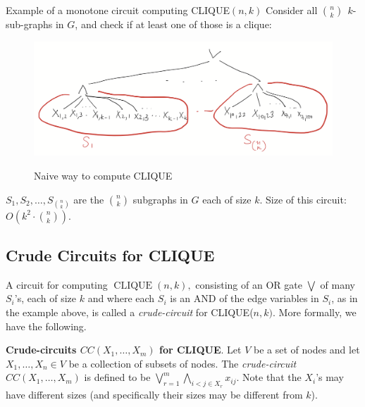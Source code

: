 \begin{trailer}{Example of a monotone circuit computing CLIQUE$(n, k)$}
Consider  all $\binom{n}{k} ~~ k$-sub-graphs in $G$, and check if at least one of those is a clique:

\begin{figure}
    \centering
    \includegraphics[width=0.75\linewidth]{images/k-clique-simple-circuit.png}
    \label{fig:clique-naive}
    \caption{Naive way to compute CLIQUE}
\end{figure}

$S_1, S_2, \ldots, S_{\binom{n}{k}}$ are the $\binom{n}{k}$ subgraphs in $G$ each of size $k$.
Size of this circuit: $O\left(k^2 \cdot\binom{n}{k}\right)$.
\end{trailer}

\subsection{Crude Circuits for CLIQUE}

A  circuit for computing $\operatorname{CLIQUE}  (n, k),$ consisting of an OR gate $\bigvee$ of many  $S_i$'s, each of size $k$ and where each $S_i$ is an AND of the edge variables in $S_i$, as in the example above, is called a \textit{crude-circuit} for CLIQUE($n, k)$. More formally, we have the following. 


\begin{tcolorbox}[colframe=white, colback=red!5, boxrule=0mm, sharp corners]
\textbf{Crude-circuits $CC\left(X_1, \ldots, X_m\right)$ for CLIQUE}.
Let $V$ be a set of nodes and let $X_1,\dots,X_n\in V$ be a collection of subsets of nodes. The \emph{crude-circuit} $CC\left(X_1, \ldots, X_m\right)$ is defined to be 
$\bigvee_{r=1}^m\bigwedge_{i<j \in X_r} x_{ij}$.
Note that the $X_i$'s may have different sizes (and specifically their sizes may be different from $k$).
\end{tcolorbox}
 
